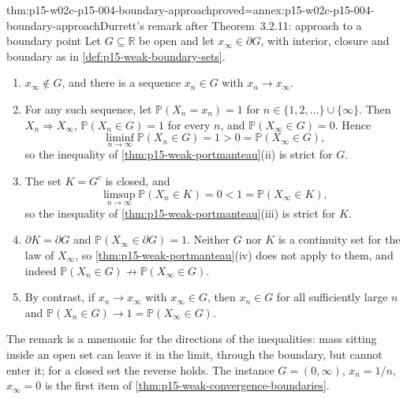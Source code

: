 \begin{hbtheorem}{thm:p15-w02c-p15-004-boundary-approach}{proved=annex:p15-w02c-p15-004-boundary-approach}{Durrett's remark after Theorem~3.2.11: approach to a boundary point}
Let \(G\subseteq\mathbb R\) be open and let \(x_\infty\in\partial G\),
with interior, closure and boundary as in
\cref{def:p15-weak-boundary-sets}.
\begin{enumerate}
\item \(x_\infty\notin G\), and there is a sequence \(x_n\in G\) with
\(x_n\to x_\infty\).
\item For any such sequence, let \(\mathbb P(X_n=x_n)=1\) for
\(n\in\{1,2,\ldots\}\cup\{\infty\}\). Then \(X_n\Rightarrow X_\infty\),
\(\mathbb P(X_n\in G)=1\) for every \(n\), and
\(\mathbb P(X_\infty\in G)=0\). Hence
\[
 \liminf_{n\to\infty}\mathbb P(X_n\in G)=1>0=\mathbb P(X_\infty\in G),
\]
so the inequality of \cref{thm:p15-weak-portmanteau}(ii) is strict
for \(G\).
\item The set \(K=G^c\) is closed, and
\[
 \limsup_{n\to\infty}\mathbb P(X_n\in K)=0<1=\mathbb P(X_\infty\in K),
\]
so the inequality of \cref{thm:p15-weak-portmanteau}(iii) is strict
for \(K\).
\item \(\partial K=\partial G\) and
\(\mathbb P(X_\infty\in\partial G)=1\). Neither \(G\) nor \(K\) is a
continuity set for the law of \(X_\infty\), so
\cref{thm:p15-weak-portmanteau}(iv) does not apply to them, and indeed
\(\mathbb P(X_n\in G)\not\to\mathbb P(X_\infty\in G)\).
\item By contrast, if \(x_n\to x_\infty\) with \(x_\infty\in G\), then
\(x_n\in G\) for all sufficiently large \(n\) and
\(\mathbb P(X_n\in G)\to1=\mathbb P(X_\infty\in G)\).
\end{enumerate}
\end{hbtheorem}

The remark is a mnemonic for the directions of the inequalities: mass
sitting inside an open set can leave it in the limit, through the
boundary, but cannot enter it; for a closed set the reverse holds. The
instance \(G=(0,\infty)\), \(x_n=1/n\), \(x_\infty=0\) is the first
item of \cref{thm:p15-weak-convergence-boundaries}.

